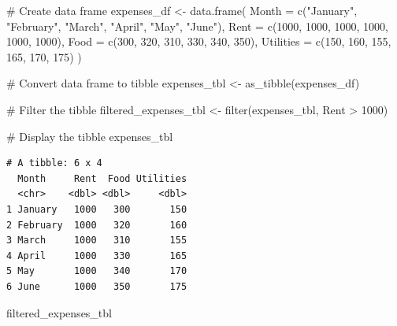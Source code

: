 \documentclass[
  letterpaper,
  DIV=11,
  numbers=noendperiod]{scrreprt}
\newenvironment{Shaded}{\begin{snugshade}}{\end{snugshade}}
\newcommand{\AttributeTok}[1]{\textcolor[rgb]{0.40,0.45,0.13}{#1}}
\newcommand{\CommentTok}[1]{\textcolor[rgb]{0.37,0.37,0.37}{#1}}
\newcommand{\DecValTok}[1]{\textcolor[rgb]{0.68,0.00,0.00}{#1}}
\newcommand{\FunctionTok}[1]{\textcolor[rgb]{0.28,0.35,0.67}{#1}}
\newcommand{\NormalTok}[1]{\textcolor[rgb]{0.00,0.23,0.31}{#1}}
\newcommand{\OtherTok}[1]{\textcolor[rgb]{0.00,0.23,0.31}{#1}}
\newcommand{\SpecialCharTok}[1]{\textcolor[rgb]{0.37,0.37,0.37}{#1}}
\newcommand{\StringTok}[1]{\textcolor[rgb]{0.13,0.47,0.30}{#1}}
\begin{document}
\begin{Shaded}
\begin{Highlighting}[]
\CommentTok{\# Create data frame}
\NormalTok{expenses\_df }\OtherTok{\textless{}{-}} \FunctionTok{data.frame}\NormalTok{(}
  \AttributeTok{Month =} \FunctionTok{c}\NormalTok{(}\StringTok{"January"}\NormalTok{, }\StringTok{"February"}\NormalTok{, }\StringTok{"March"}\NormalTok{, }\StringTok{"April"}\NormalTok{, }\StringTok{"May"}\NormalTok{, }\StringTok{"June"}\NormalTok{),}
  \AttributeTok{Rent =} \FunctionTok{c}\NormalTok{(}\DecValTok{1000}\NormalTok{, }\DecValTok{1000}\NormalTok{, }\DecValTok{1000}\NormalTok{, }\DecValTok{1000}\NormalTok{, }\DecValTok{1000}\NormalTok{, }\DecValTok{1000}\NormalTok{),}
  \AttributeTok{Food =} \FunctionTok{c}\NormalTok{(}\DecValTok{300}\NormalTok{, }\DecValTok{320}\NormalTok{, }\DecValTok{310}\NormalTok{, }\DecValTok{330}\NormalTok{, }\DecValTok{340}\NormalTok{, }\DecValTok{350}\NormalTok{),}
  \AttributeTok{Utilities =} \FunctionTok{c}\NormalTok{(}\DecValTok{150}\NormalTok{, }\DecValTok{160}\NormalTok{, }\DecValTok{155}\NormalTok{, }\DecValTok{165}\NormalTok{, }\DecValTok{170}\NormalTok{, }\DecValTok{175}\NormalTok{)}
\NormalTok{)}

\CommentTok{\# Convert data frame to tibble}
\NormalTok{expenses\_tbl }\OtherTok{\textless{}{-}} \FunctionTok{as\_tibble}\NormalTok{(expenses\_df)}

\CommentTok{\# Filter the tibble}
\NormalTok{filtered\_expenses\_tbl }\OtherTok{\textless{}{-}} \FunctionTok{filter}\NormalTok{(expenses\_tbl, Rent }\SpecialCharTok{\textgreater{}} \DecValTok{1000}\NormalTok{)}

\CommentTok{\# Display the tibble}
\NormalTok{expenses\_tbl}
\end{Highlighting}
\end{Shaded}

\begin{verbatim}
# A tibble: 6 x 4
  Month     Rent  Food Utilities
  <chr>    <dbl> <dbl>     <dbl>
1 January   1000   300       150
2 February  1000   320       160
3 March     1000   310       155
4 April     1000   330       165
5 May       1000   340       170
6 June      1000   350       175
\end{verbatim}

\begin{Shaded}
\begin{Highlighting}[]
\NormalTok{filtered\_expenses\_tbl}
\end{Highlighting}
\end{Shaded}
\end{document}
